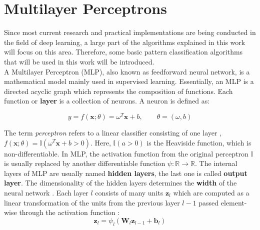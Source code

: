 \section{Multilayer Perceptrons}
\label{sec:Multilayer_Perceptron}
Since most current research and practical implementations are being conducted in the field of deep learning, a large part of the algorithms explained in this work will focus on this area. Therefore, some basic pattern classification algorithms that will be used in this work will be introduced.\\
A Multilayer Perceptron (MLP), also known as feedforward neural network, is a mathematical model mainly used in supervised learning. Essentially, an MLP is a directed acyclic graph which represents the composition of functions. Each function or \textbf{layer} is a collection of neurons. A neuron is defined as:

\begin{equation}
    \label{eqn:neuron}
    y = f(\mathbf{x}; \theta) = \omega^T \mathbf{x} + b, \qquad \theta = (\omega, b)
\end{equation}

The term \textit{perceptron} refers to a linear classifier consisting of one layer \cite{rosenblatt1958}, $f(\mathbf{x}; \theta) = \mathbb{I}(\omega^T \mathbf{x} + b > 0)$.
Here, $\mathbb{I}(a>0)$ is the Heaviside function, which is non-differentiable. In MLP, the activation function from the original perceptron $\mathbb{I}$ is usually replaced by another differentiable function $\psi \colon \mathbb{R} \to \mathbb{R}$. The internal layers of MLP are usually named \textbf{hidden layers}, the last one is called \textbf{output layer}. The dimensionality of the hidden layers determines the \textbf{width} of the neural network \cite{goodfellow2016}. Each layer $l$ consists of many units $\mathbf{z}_l$ which are computed as a linear transformation of the units from the previous layer $l-1$ passed element-wise through the activation function \cite{murphy2022}:
\begin{equation*}
    \mathbf{z}_l = \psi_l (\mathbf{W}_l \mathbf{z}_{l-1} + \mathbf{b}_l)
\end{equation*}


